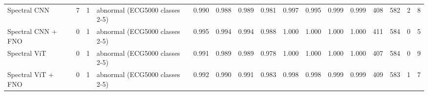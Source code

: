 \begin{longtable}{llrlllllllllllll}
Spectral CNN & 7 & 1 & abnormal (ECG5000 classes 2-5) & 0.990 & 0.988 & 0.989 & 0.981 & 0.997 & 0.995 & 0.999 & 0.999 & 408 & 582 & 2 & 8 \\
Spectral CNN + FNO & 0 & 1 & abnormal (ECG5000 classes 2-5) & 0.995 & 0.994 & 0.994 & 0.988 & 1.000 & 1.000 & 1.000 & 1.000 & 411 & 584 & 0 & 5 \\
Spectral ViT & 0 & 1 & abnormal (ECG5000 classes 2-5) & 0.991 & 0.989 & 0.989 & 0.978 & 1.000 & 1.000 & 1.000 & 1.000 & 407 & 584 & 0 & 9 \\
Spectral ViT + FNO & 0 & 1 & abnormal (ECG5000 classes 2-5) & 0.992 & 0.990 & 0.991 & 0.983 & 0.998 & 0.998 & 0.999 & 0.999 & 409 & 583 & 1 & 7 \\
\end{longtable}
